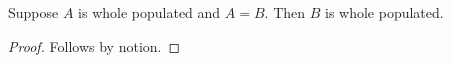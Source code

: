 

\begin{proposition}\label{whole_abbreviation_stays_exact}
    Suppose $A$ is whole populated and $A=B$.
    Then $B$ is whole populated.
\end{proposition}
\begin{proof}
    Follows by notion.
\end{proof}
